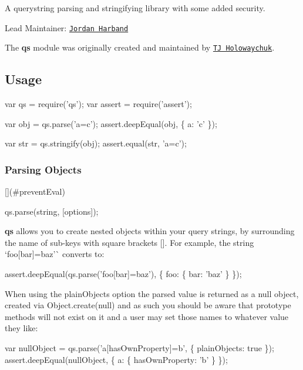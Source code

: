 A querystring parsing and stringifying library with some added security.

\href{http://travis-ci.org/ljharb/qs}{\tt }

Lead Maintainer\+: \href{https://github.com/ljharb}{\tt Jordan Harband}

The {\bfseries qs} module was originally created and maintained by \href{https://github.com/visionmedia/node-querystring}{\tt TJ Holowaychuk}.

\subsection*{Usage}


\begin{DoxyCode}
var qs = require('qs');
var assert = require('assert');

var obj = qs.parse('a=c');
assert.deepEqual(obj, \{ a: 'c' \});

var str = qs.stringify(obj);
assert.equal(str, 'a=c');
\end{DoxyCode}


\subsubsection*{Parsing Objects}

\mbox{[}\mbox{]}(\#prevent\+Eval) 
\begin{DoxyCode}
qs.parse(string, [options]);
\end{DoxyCode}


{\bfseries qs} allows you to create nested objects within your query strings, by surrounding the name of sub-\/keys with square brackets {\ttfamily \mbox{[}\mbox{]}}. For example, the string `\textquotesingle{}foo\mbox{[}bar\mbox{]}=baz'\`{} converts to\+:


\begin{DoxyCode}
assert.deepEqual(qs.parse('foo[bar]=baz'), \{
  foo: \{
    bar: 'baz'
  \}
\});
\end{DoxyCode}


When using the {\ttfamily plain\+Objects} option the parsed value is returned as a null object, created via {\ttfamily Object.\+create(null)} and as such you should be aware that prototype methods will not exist on it and a user may set those names to whatever value they like\+:


\begin{DoxyCode}
var nullObject = qs.parse('a[hasOwnProperty]=b', \{ plainObjects: true \});
assert.deepEqual(nullObject, \{ a: \{ hasOwnProperty: 'b' \} \});
\end{DoxyCode}


